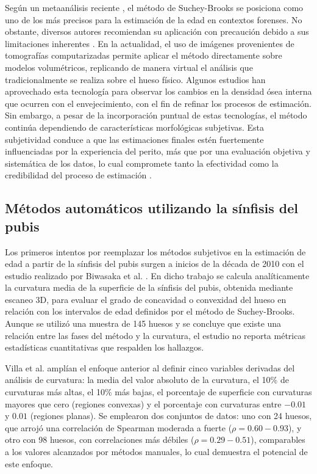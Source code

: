 Según un metaanálisis reciente \cite{schanandore2022accuracy}, el método de Suchey-Brooks se posiciona como uno de los más precisos para la estimación de la edad en contextos forenses. No obstante, diversos autores recomiendan su aplicación con precaución debido a sus limitaciones inherentes \cite{priya2017methods}. En la actualidad, el uso de imágenes provenientes de tomografías computarizadas permite aplicar el método directamente sobre modelos volumétricos, replicando de manera virtual el análisis que tradicionalmente se realiza sobre el hueso físico. Algunos estudios \cite{wade2011preliminary,villa2013forensic,lottering2014morphometric,lopez2015image} han aprovechado esta tecnología para observar los cambios en la densidad ósea interna que ocurren con el envejecimiento, con el fin de refinar los procesos de estimación. Sin embargo, a pesar de la incorporación puntual de estas tecnologías, el método continúa dependiendo de características morfológicas subjetivas. Esta subjetividad conduce a que las estimaciones finales estén fuertemente influenciadas por la experiencia del perito, más que por una evaluación objetiva y sistemática de los datos, lo cual compromete tanto la efectividad como la credibilidad del proceso de estimación \cite{garvin_current_2012}.

\subsection{Métodos automáticos utilizando la sínfisis del pubis}

Los primeros intentos por reemplazar los métodos subjetivos en la estimación de edad a partir de la sínfisis del pubis surgen a inicios de la década de 2010 con el estudio realizado por Biwasaka et al. \cite{biwasaka2013three}. En dicho trabajo se calcula analíticamente la curvatura media de la superficie de la sínfisis del pubis, obtenida mediante escaneo 3D, para evaluar el grado de concavidad o convexidad del hueso en relación con los intervalos de edad definidos por el método de Suchey-Brooks. Aunque se utilizó una muestra de 145 huesos y se concluye que existe una relación entre las fases del método y la curvatura, el estudio no reporta métricas estadísticas cuantitativas que respalden los hallazgos.

Villa et al. \cite{villa2015quantitative} amplían el enfoque anterior al definir cinco variables derivadas del análisis de curvatura: la media del valor absoluto de la curvatura, el 10\% de curvaturas más altas, el 10\% más bajas, el porcentaje de superficie con curvaturas mayores que cero (regiones convexas) y el porcentaje con curvaturas entre $-0.01$ y $0.01$ (regiones planas). Se emplearon dos conjuntos de datos: uno con 24 huesos, que arrojó una correlación de Spearman moderada a fuerte ($\rho=0.60-0.93$), y otro con 98 huesos, con correlaciones más débiles ($\rho=0.29-0.51$), comparables a los valores alcanzados por métodos manuales, lo cual demuestra el potencial de este enfoque.

